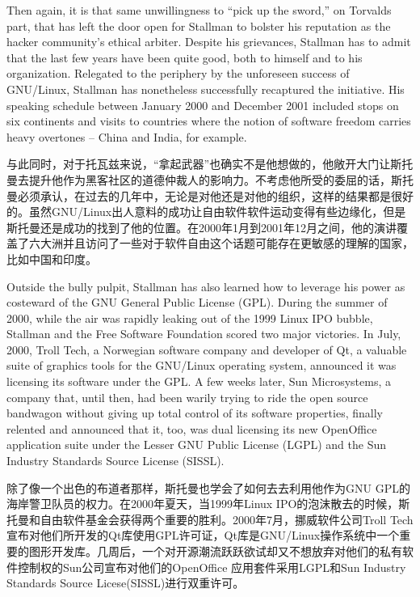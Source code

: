 \ifdefined\eng
Then again, it is that same unwillingness to ``pick up the sword,'' on Torvalds part, that has left the door open for Stallman to bolster his reputation as the hacker community's ethical arbiter. Despite his grievances, Stallman has to admit that the last few years have been quite good, both to himself and to his organization. Relegated to the periphery by the unforeseen success of GNU/Linux, Stallman has nonetheless successfully recaptured the initiative. His speaking schedule between January 2000 and December 2001 included stops on six continents and visits to countries where the notion of software freedom carries heavy overtones -- China and India, for example.
\fi

\ifdefined\chs
与此同时，对于托瓦兹来说，``拿起武器''也确实不是他想做的，他敞开大门让斯托曼去提升他作为黑客社区的道德仲裁人的影响力。不考虑他所受的委屈的话，斯托曼必须承认，在过去的几年中，无论是对他还是对他的组织，这样的结果都是很好的。虽然GNU/Linux出人意料的成功让自由软件软件运动变得有些边缘化，但是斯托曼还是成功的找到了他的位置。在2000年1月到2001年12月之间，他的演讲覆盖了六大洲并且访问了一些对于软件自由这个话题可能存在更敏感的理解的国家，比如中国和印度。
\fi

\ifdefined\eng
Outside the bully pulpit, Stallman has also learned how to leverage his power as costeward of the GNU General Public License (GPL). During the summer of 2000, while the air was rapidly leaking out of the 1999 Linux IPO bubble, Stallman and the Free Software Foundation scored two major victories. In July, 2000, Troll Tech, a Norwegian software company and developer of Qt, a valuable suite of graphics tools for the GNU/Linux operating system, announced it was licensing its software under the GPL. A few weeks later, Sun Microsystems, a company that, until then, had been warily trying to ride the open source bandwagon without giving up total control of its software properties, finally relented and announced that it, too, was dual licensing its new OpenOffice %
application suite under the Lesser GNU Public License (LGPL) and the Sun Industry Standards Source License (SISSL).
\fi

\ifdefined\chs
除了像一个出色的布道者那样，斯托曼也学会了如何去去利用他作为GNU GPL的海岸警卫队员的权力。在2000年夏天，当1999年Linux IPO的泡沫散去的时候，斯托曼和自由软件基金会获得两个重要的胜利。2000年7月，挪威软件公司Troll Tech宣布对他们所开发的Qt库使用GPL许可证，Qt库是GNU/Linux操作系统中一个重要的图形开发库。几周后，一个对开源潮流跃跃欲试却又不想放弃对他们的私有软件控制权的Sun公司宣布对他们的OpenOffice%
应用套件采用LGPL和Sun Industry Standards Source Licese(SISSL)进行双重许可。
\fi


